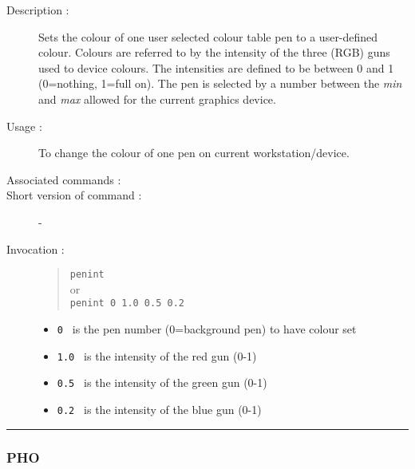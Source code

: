 \begin{description}

\item[Description :] Sets the colour of one user selected colour table
pen to a user-defined colour.  Colours are referred to by the intensity
of the three (RGB) guns used to device colours.  The intensities are
defined to be between 0 and 1 (0=nothing, 1=full on).  The pen is
selected by a number between the {\it min} and {\it max} allowed for
the current graphics device.

\item[Usage :] To change the colour of one pen on current workstation/device.
\item[Associated commands :] {\tt {}}
\item[Short version of command :] -
\item[Invocation :]

\begin{quote}{\tt  penint }\\
or \\
{\tt penint 0 1.0 0.5 0.2 }
\end{quote}

\begin{itemize}

\item {\tt 0 } is the pen number (0=background pen) to have colour set
\item {\tt 1.0 } is the intensity of the red gun (0-1)
\item {\tt 0.5 } is the intensity of the green gun (0-1)
\item {\tt 0.2 } is the intensity of the blue gun (0-1)
\end{itemize}

\end{description}

\hrule 
\subsubsection*{\label{PHO}PHO}

